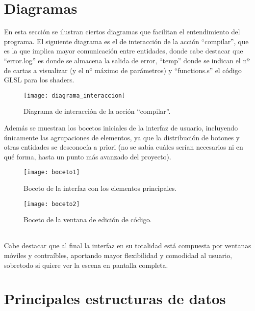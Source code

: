 \section{Diagramas}
En esta sección se ilustran ciertos diagramas que facilitan el entendimiento del programa. El siguiente diagrama es el de interacción de la acción ``compilar'', que es la que implica mayor comunicación entre entidades, donde cabe destacar que ``error.log'' es donde se almacena la salida de error, ``temp'' donde se indican el nº de cartas a visualizar (y el nº máximo de parámetros) y ``functions.s'' el código GLSL para los shaders.\\
\begin{figure}[h]
  	\centering
  	\texttt{[image: diagrama\_interaccion]}
  	\caption{Diagrama de interacción de la acción ``compilar''.}
  	\label{fig:diagrama_interaccion}
\end{figure}
\newpage
Además se muestran los bocetos iniciales de la interfaz de usuario, incluyendo únicamente las agrupaciones de elementos, ya que la distribución de botones y otras entidades se desconocía a priori (no se sabía cuáles serían necesarios ni en qué forma, hasta un punto más avanzado del proyecto).\\
\begin{figure}[h]
  	\centering
  	\texttt{[image: boceto1]}
  	\caption{Boceto de la interfaz con los elementos principales.}
  	\texttt{[image: boceto2]}
  	\caption{Boceto de la ventana de edición de código.}
  	\label{fig:bocetos_interfaz}
\end{figure}
\\Cabe destacar que al final la interfaz en su totalidad está compuesta por ventanas móviles y contraíbles, aportando mayor flexibilidad y comodidad al usuario, sobretodo si quiere ver la escena en pantalla completa.

\section{Principales estructuras de datos}

